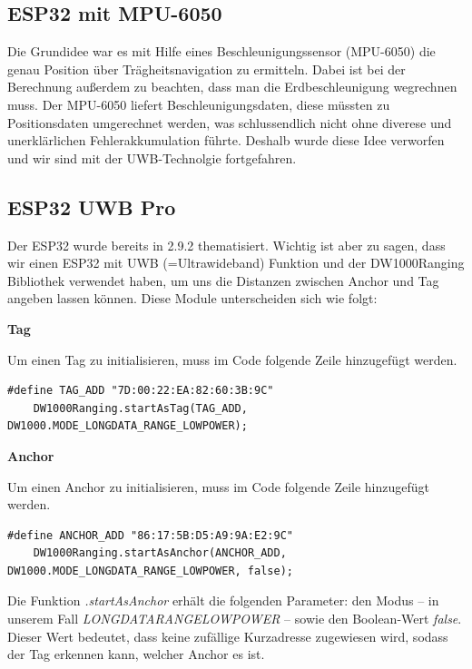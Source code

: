 \subsection{ESP32 mit MPU-6050}
Die Grundidee war es mit Hilfe eines Beschleunigungssensor (MPU-6050) die genau Position über Trägheitsnavigation zu ermitteln. Dabei ist bei der Berechnung außerdem zu beachten, dass man die Erdbeschleunigung wegrechnen muss. Der MPU-6050 liefert Beschleunigungsdaten, diese müssten zu Positionsdaten umgerechnet werden, was schlussendlich nicht ohne diverese und unerklärlichen Fehlerakkumulation führte. Deshalb wurde diese Idee verworfen und wir sind mit der UWB-Technolgie fortgefahren. \parencite{MPU6050}

\subsection{ESP32 UWB Pro}

Der ESP32 wurde bereits in 2.9.2 thematisiert. Wichtig ist aber zu sagen, dass wir einen ESP32 mit UWB (=Ultrawideband) Funktion und der DW1000Ranging Bibliothek verwendet haben, um uns die Distanzen zwischen Anchor und Tag angeben lassen können. Diese Module unterscheiden sich wie folgt:

\textbf{Tag}

Um einen Tag zu initialisieren, muss im Code folgende Zeile hinzugefügt werden.
\begin{lstlisting}[style=C++, caption=Tag Initialisierung, captionpos=b]
	#define TAG_ADD "7D:00:22:EA:82:60:3B:9C"
	DW1000Ranging.startAsTag(TAG_ADD, DW1000.MODE_LONGDATA_RANGE_LOWPOWER);
\end{lstlisting}  

\textbf{Anchor}

Um einen Anchor zu initialisieren, muss im Code folgende Zeile hinzugefügt werden.
\begin{lstlisting}[style=C++, caption=Anchor Initialisierung, captionpos=b]
	#define ANCHOR_ADD "86:17:5B:D5:A9:9A:E2:9C"
	DW1000Ranging.startAsAnchor(ANCHOR_ADD, DW1000.MODE_LONGDATA_RANGE_LOWPOWER, false);
\end{lstlisting} 

Die Funktion \textit{.startAsAnchor} erhält die folgenden Parameter: den Modus – in unserem Fall \textit{LONGDATA\textunderscore RANGE\textunderscore LOWPOWER} – sowie den Boolean-Wert \textit{false}. Dieser Wert bedeutet, dass keine zufällige Kurzadresse zugewiesen wird, sodass der Tag erkennen kann, welcher Anchor es ist.

